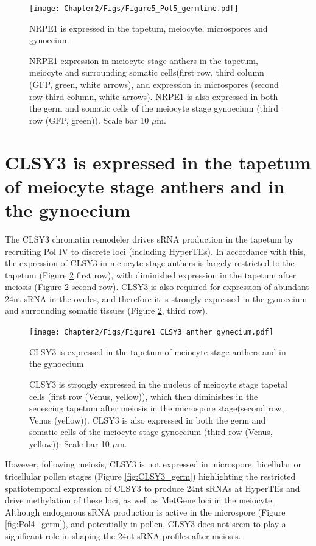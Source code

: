 \begin{figure}[htbp!] 
\centering    
    \texttt{[image: Chapter2/Figs/Figure5\_Pol5\_germline.pdf]}
\caption{NRPE1 is expressed in the tapetum, meiocyte, microspores and gynoecium}
\label{fig:Pol5_germ}
\captionsetup{font=small}
    \caption*{NRPE1 expression in meiocyte stage anthers in the tapetum, meiocyte and surrounding somatic cells(first row, third column (GFP, green, white arrows), and expression in microspores (second row third column, white arrows). NRPE1 is also expressed in both the germ and somatic cells of the meiocyte stage gynoecium (third row (GFP, green)). Scale bar 10 $\mu$m.}
\end{figure}


\section{CLSY3 is expressed in the tapetum of meiocyte stage anthers and in the gynoecium}

The CLSY3 chromatin remodeler drives sRNA production in the tapetum \cite{RN187} by recruiting Pol IV to discrete loci (including HyperTEs)\cite{RN23}. In accordance with this, the expression of CLSY3 in meiocyte stage anthers is largely restricted to the tapetum (Figure \ref{fig:CLSY3_anther} first row), with diminished expression in the tapetum after meiosis (Figure \ref{fig:CLSY3_anther} second row). CLSY3 is also required for expression of abundant 24nt sRNA in the ovules, and therefore it is strongly expressed in the gynoecium and surrounding somatic tissues (Figure \ref{fig:CLSY3_anther}, third row).

\begin{figure}[htbp!] 
\centering    
    \texttt{[image: Chapter2/Figs/Figure1\_CLSY3\_anther\_gynecium.pdf]}
\caption{CLSY3 is expressed in the tapetum of meiocyte stage anthers and in the gynoecium}
\label{fig:CLSY3_anther}
\captionsetup{font=small}
    \caption*{CLSY3 is strongly expressed in the nucleus of meiocyte stage tapetal cells (first row (Venus, yellow)), which then diminishes in the senescing tapetum after meiosis in the microspore stage(second row, Venus (yellow)). CLSY3 is also expressed in both the germ and somatic cells of the meiocyte stage gynoecium (third row (Venus, yellow)). Scale bar 10 $\mu$m.}
\end{figure}

However, following meiosis, CLSY3 is not expressed in microspore, bicellular or tricellular pollen stages (Figure \ref{fig:CLSY3_germ}) highlighting the restricted spatiotemporal expression of CLSY3 to produce 24nt sRNAs at HyperTEs and drive methylation of these loci, as well as MetGene loci in the meiocyte. Although endogenous sRNA production is active in the microspore (Figure \ref{fig:Pol4_germ}), and potentially in pollen, CLSY3 does not seem to play a significant role in shaping the 24nt sRNA profiles after meiosis.

